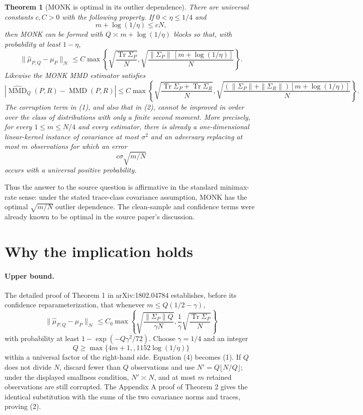 \documentclass[11pt]{article}
\newtheorem{theorem}{Theorem}
\newcommand{\Hcal}{\mathcal H}
\newcommand{\Tr}{\operatorname{Tr}}
\newcommand{\MMD}{\operatorname{MMD}}
\begin{document}
\begin{theorem}[MONK is optimal in its outlier dependence]
There are universal constants $c,C>0$ with the following property.  If
$0<\eta\le 1/4$ and
\[
 m+\log(1/\eta)\le cN,
\]
then MONK can be formed with $Q\asymp m+\log(1/\eta)$ blocks so that, with
probability at least $1-\eta$,
\begin{equation}
 \|\widehat\mu_{P,Q}-\mu_P\|_{\Hcal}
 \le C\max\left\{
 \sqrt{\frac{\Tr\Sigma_P}{N}},
 \sqrt{\frac{\|\Sigma_P\|\,[m+\log(1/\eta)]}{N}}
 \right\}.                                      \tag{1}
\end{equation}
Likewise the MONK MMD estimator satisfies
\begin{equation}
 |\widehat{\MMD}_Q(P,R)-\MMD(P,R)|
 \le C\max\left\{
 \sqrt{\frac{\Tr\Sigma_P+\Tr\Sigma_R}{N}},
 \sqrt{\frac{(\|\Sigma_P\|+\|\Sigma_R\|)
 [m+\log(1/\eta)]}{N}}
 \right\}.                                      \tag{2}
\end{equation}
The corruption term in (1), and also that in (2), cannot be improved in
order over the class of distributions with only a finite second moment.  More
precisely, for every $1\le m\le N/4$ and every estimator, there is already a
one-dimensional linear-kernel instance of covariance at most $\sigma^2$ and
an adversary replacing at most $m$ observations for which an error
\[
 c\sigma\sqrt{m/N}                               \tag{3}
\]
occurs with a universal positive probability.
\end{theorem}

Thus the answer to the source question is affirmative in the standard
minimax-rate sense: under the stated trace-class covariance assumption,
MONK has the optimal $\sqrt{m/N}$ outlier dependence.  The clean-sample and
confidence terms were already known to be optimal in the source paper's
discussion.

\section*{Why the implication holds}

\paragraph{Upper bound.}
The detailed proof of Theorem 1 in arXiv:1802.04784 establishes, before its
confidence reparameterization, that whenever
$m\le Q(1/2-\gamma)$,
\begin{equation}
 \|\widehat\mu_{P,Q}-\mu_P\|_{\Hcal}
 \le C_0\max\left\{
 \sqrt{\frac{\|\Sigma_P\|Q}{\gamma N}},
 \frac1\gamma\sqrt{\frac{\Tr\Sigma_P}{N}}
 \right\}                                      \tag{4}
\end{equation}
with probability at least $1-\exp(-Q\gamma^2/72)$.  Choose
$\gamma=1/4$ and an integer
\[
 Q\ge \max\{4m+1,,1152\log(1/\eta)\}
\]
within a universal factor of the right-hand side.  Equation (4) becomes (1).
If $Q$ does not divide $N$, discard fewer than $Q$ observations and use
$N'=Q\lfloor N/Q\rfloor$; under the displayed smallness condition,
$N'\asymp N$, and at most $m$ retained observations are still corrupted.
The Appendix A proof of Theorem 2 gives the identical substitution with the
sums of the two covariance norms and traces, proving (2).
\end{document}
